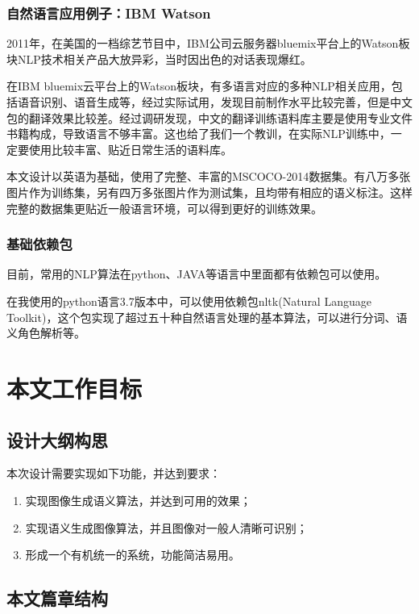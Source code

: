 \subsubsection{自然语言应用例子：IBM Watson}
2011年，在美国的一档综艺节目中，IBM公司云服务器bluemix平台上的Watson板块NLP技术相关产品大放异彩，当时因出色的对话表现爆红。

在IBM bluemix云平台上的Watson板块，有多语言对应的多种NLP相关应用，包括语音识别、语音生成等，经过实际试用，发现目前制作水平比较完善，但是中文包的翻译效果比较差。经过调研发现，中文的翻译训练语料库主要是使用专业文件书籍构成，导致语言不够丰富。这也给了我们一个教训，在实际NLP训练中，一定要使用比较丰富、贴近日常生活的语料库。

本文设计以英语为基础，使用了完整、丰富的MSCOCO-2014数据集。有八万多张图片作为训练集，另有四万多张图片作为测试集，且均带有相应的语义标注。这样完整的数据集更贴近一般语言环境，可以得到更好的训练效果。

\subsubsection{基础依赖包}
目前，常用的NLP算法在python、JAVA等语言中里面都有依赖包可以使用。

在我使用的python语言3.7版本中，可以使用依赖包nltk(Natural Language Toolkit)，这个包实现了超过五十种自然语言处理的基本算法，可以进行分词、语义角色解析等。

\section{本文工作目标}

\subsection{设计大纲构思}
本次设计需要实现如下功能，并达到要求：
\begin{enumerate}[fullwidth,itemindent=2em,label=\arabic*.]
    \item 实现图像生成语义算法，并达到可用的效果；
    \item 实现语义生成图像算法，并且图像对一般人清晰可识别；
    \item 形成一个有机统一的系统，功能简洁易用。
\end{enumerate}

\subsection{本文篇章结构}

